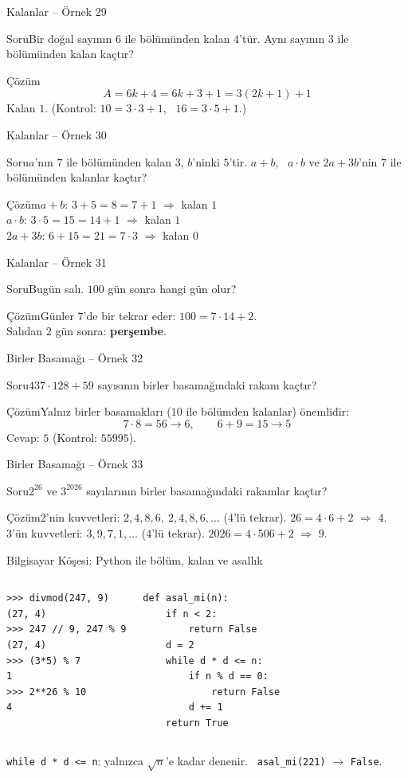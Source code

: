 \documentclass[aspectratio=169,11pt,handout]{beamer}
\newcommand{\soru}[3]{%
\begin{frame}{#1}
  \begin{block}{Soru}\large #2\end{block}
  \pause
  \begin{exampleblock}{Çözüm}\large #3\end{exampleblock}
\end{frame}}
\begin{document}
\soru{Kalanlar -- Örnek 29}
{Bir doğal sayının \(6\) ile bölümünden kalan \(4\)'tür. Aynı sayının \(3\) ile bölümünden kalan kaçtır?}
{\[A=6k+4=6k+3+1=3(2k+1)+1\]
Kalan \(1\). \quad (Kontrol: \(10=3\cdot 3+1\), \ \(16=3\cdot 5+1\).)}

\soru{Kalanlar -- Örnek 30}
{\(a\)'nın \(7\) ile bölümünden kalan \(3\), \(b\)'ninki \(5\)'tir. \(a+b\), \ \(a\cdot b\) ve \(2a+3b\)'nin \(7\) ile bölümünden kalanlar kaçtır?}
{\(a+b\): \(3+5=8=7+1\) \(\Rightarrow\) kalan \(1\)\\[2pt]
\(a\cdot b\): \(3\cdot 5=15=14+1\) \(\Rightarrow\) kalan \(1\)\\[2pt]
\(2a+3b\): \(6+15=21=7\cdot 3\) \(\Rightarrow\) kalan \(0\)}

\soru{Kalanlar -- Örnek 31}
{Bugün salı. \(100\) gün sonra hangi gün olur?}
{Günler \(7\)'de bir tekrar eder: \(100=7\cdot 14+2\).\\[3pt]
Salıdan \(2\) gün sonra: \textbf{perşembe}.}

\soru{Birler Basamağı -- Örnek 32}
{\(437\cdot 128+59\) sayısının birler basamağındaki rakam kaçtır?}
{Yalnız birler basamakları (\(10\) ile bölümden kalanlar) önemlidir:
\[7\cdot 8=56\to 6,\qquad 6+9=15\to 5\]
Cevap: \(5\) \quad (Kontrol: \(55995\)).}

\soru{Birler Basamağı -- Örnek 33}
{\(2^{26}\) ve \(3^{2026}\) sayılarının birler basamağındaki rakamlar kaçtır?}
{\(2\)'nin kuvvetleri: \(2,4,8,6,\ 2,4,8,6,\dots\) (\(4\)'lü tekrar). \(26=4\cdot 6+2\) \(\Rightarrow\) \(4\).\\[3pt]
\(3\)'ün kuvvetleri: \(3,9,7,1,\dots\) (\(4\)'lü tekrar). \(2026=4\cdot 506+2\) \(\Rightarrow\) \(9\).}

\begin{frame}[fragile]{Bilgisayar Köşesi: Python ile bölüm, kalan ve asallık}
\begin{columns}[t]
\begin{verbatim}
>>> divmod(247, 9)
(27, 4)
>>> 247 // 9, 247 % 9
(27, 4)
>>> (3*5) % 7
1
>>> 2**26 % 10
4
\end{verbatim}
\begin{verbatim}
def asal_mi(n):
    if n < 2:
        return False
    d = 2
    while d * d <= n:
        if n % d == 0:
            return False
        d += 1
    return True
\end{verbatim}
\end{columns}
\small \verb|while d * d <= n|: yalnızca \(\sqrt{n}\)'e kadar denenir. \ \verb|asal_mi(221)| \(\to\) \verb|False|.
\end{frame}
\end{document}
